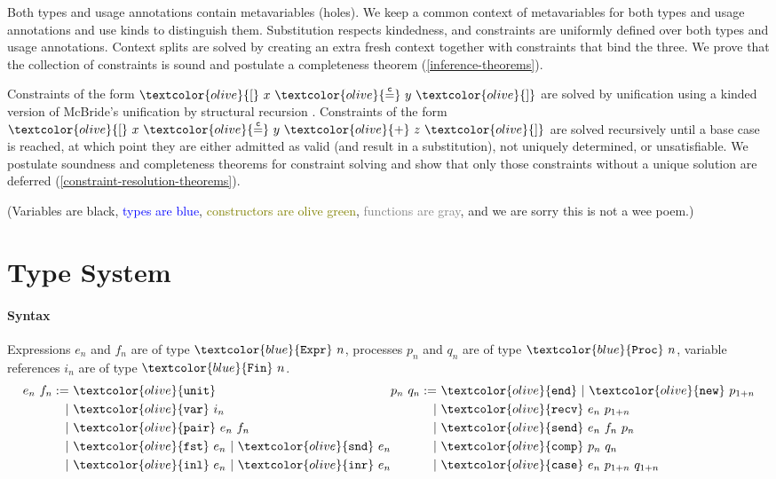 \documentclass[sigplan,screen,review]{acmart}
\newcommand{\constr}[1]{\textcolor{olive}{\mathtt{#1}}}
\newcommand{\type}[1]{\textcolor{blue}{\mathtt{#1}}}
\newcommand{\Fin}[1]{\type{Fin}~#1}
\newcommand{\sExpr}[1]{\type{Expr}~#1}
\newcommand{\sProc}[1]{\type{Proc}~#1}
\newcommand{\sunit}{\constr{unit}}
\newcommand{\svar}{\constr{var}}
\newcommand{\sfst}{\constr{fst}}
\newcommand{\ssnd}{\constr{snd}}
\newcommand{\sinl}{\constr{inl}}
\newcommand{\sinr}{\constr{inr}}
\newcommand{\spair}{\constr{pair}}
\newcommand{\send}{\constr{end}}
\newcommand{\snew}{\constr{new}}
\newcommand{\scomp}{\constr{comp}}
\newcommand{\srecv}{\constr{recv}}
\newcommand{\ssend}{\constr{send}}
\newcommand{\scase}{\constr{case}}
\newcommand{\eqconstr}[2]{\constr{[} ~ #1 ~ \constr{\stackrel{c}{=}} ~ #2 ~ \constr{]}}
\newcommand{\sumconstr}[3]{\constr{[} ~ #1 ~ \constr{\stackrel{c}{=}} ~ #2 ~ \constr{+} ~ #3 ~ \constr{]}}
\begin{document}
Both types and usage annotations contain metavariables (holes).
We keep a common context of metavariables for both types and usage annotations and use kinds to distinguish them.
Substitution respects kindedness, and constraints are uniformly defined over both types and usage annotations.
Context splits are solved by creating an extra fresh context together with constraints that bind the three.
We prove that the collection of constraints is sound and postulate a completeness theorem (\autoref{inference-theorems}).

Constraints of the form $\eqconstr{x}{y}$ are solved by unification using a kinded version of McBride's unification by structural recursion \cite{McBride03}.
Constraints of the form $\sumconstr{x}{y}{z}$ are solved recursively until a base case is reached, at which point they are either admitted as valid (and result in a substitution), not uniquely determined, or unsatisfiable.
We postulate soundness and completeness theorems for constraint solving and show that only those constraints without a unique solution are deferred (\autoref{constraint-resolution-theorems}).

(Variables are black, \textcolor{blue}{types are blue}, \textcolor{olive}{constructors are olive green}, \textcolor{gray}{functions are gray}, and we are sorry this is not a wee poem.)


\section{Type System}

\paragraph{Syntax}
\label{syntax}

Expressions $e_n$ and $f_n$ are of type $\sExpr{n}$, processes $p_n$ and $q_n$ are of type $\sProc{n}$, variable references $i_n$ are of type $\Fin{n}$.
\[
\begin{aligned}[c]
  e_n ~ f_n  :=
  &~ \sunit \\
  |&~ \svar~i_n \\
  |&~ \spair~e_n~f_n \\
  |&~ \sfst~e_n ~|~  \ssnd~e_n \\
  |&~ \sinl~e_n ~|~  \sinr~e_n
\end{aligned}
\begin{aligned}[c]
  p_n ~ q_n  :=
  &~ \send ~|~  \snew~p_{1+n} \\
  |&~ \srecv~e_n~p_{1+n} \\
  |&~ \ssend~e_n~f_n~p_n \\
  |&~ \scomp~p_n~q_n \\
  |&~ \scase~e_n~p_{1+n}~q_{1+n} \\
\end{aligned}
\]
\end{document}
